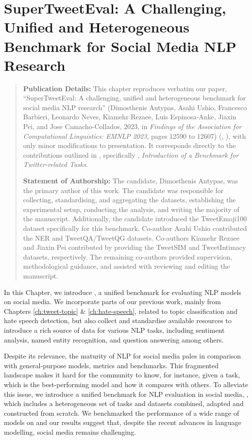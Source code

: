 \chapter{SuperTweetEval: A Challenging, Unified and Heterogeneous Benchmark for Social Media NLP Research}
\label{ch:super-tweeteval}

\begin{quote}
\textbf{Publication Details:} This chapter reproduces verbatim our paper, ``SuperTweetEval: A challenging, unified and heterogeneous benchmark for social media NLP research'' (Dimosthenis Antypas, Asahi Ushio, Francesco Barbieri, Leonardo Neves, Kiamehr Rezaee, Luis Espinosa-Anke, Jiaxin Pei, and Jose Camacho-Collados, 2023, in \textit{Findings of the Association for Computational Linguistics: EMNLP 2023}, pages 12590 to 12607) (, ), with only minor modifications to presentation. It corresponds directly to the contributions outlined in , specifically , \textit{Introduction of a Benchmark for Twitter-related  Tasks}.

\textbf{Statement of Authorship:} The candidate, Dimosthenis Antypas, was the primary author of this work. The candidate was responsible for collecting, standardising, and aggregating the datasets, establishing the experimental setup, conducting the analysis, and writing the majority of the manuscript. Additionally, the candidate introduced the TweetEmoji100 dataset specifically for this benchmark. Co-author Asahi Ushio contributed the NER and TweetQA/TweetQG datasets. Co-authors Kiamehr Rezaee and Jiaxin Pei contributed by providing the TweetSIM and TweetIntimacy datasets, respectively. The remaining co-authors provided supervision, methodological guidance, and assisted with reviewing and editing the manuscript.
\end{quote}

In this Chapter, we introduce {\DATASET}, a unified benchmark for evaluating \ac{NLP} models on social media. We incorporate parts of our previous work, mainly from Chapters \ref{ch:tweet-topic} \& \ref{ch:hate-speech}, related to topic classification and hate speech detection, but also collect and standardise available resources to introduce a rich source of data for various \ac{NLP} tasks, including sentiment analysis, named entity recognition, and question answering among others.

Despite its relevance, the maturity of \ac{NLP} for social media pales in comparison with general-purpose models, metrics and benchmarks. This fragmented landscape makes it hard for the community to know, for instance, given a task, which is the best-performing model and how it compares with others. To alleviate this issue, we introduce a unified benchmark for \ac{NLP} evaluation in social media, {\DATASET}, which includes a heterogeneous set of tasks and datasets combined, adapted and constructed from scratch. We benchmarked the performance of a wide range of models on {\DATASET} and our results suggest that, despite the recent advances in language modelling, social media remains challenging.

